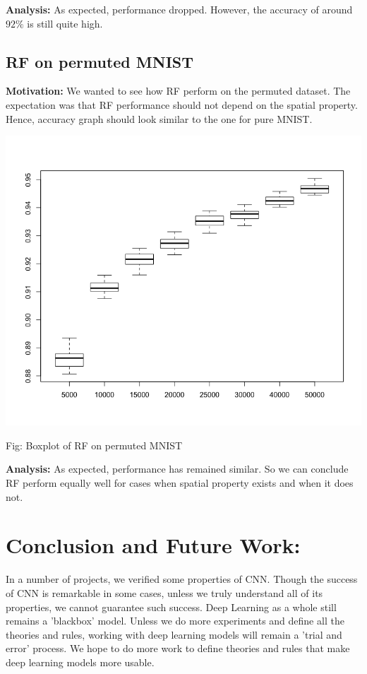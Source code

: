 \documentclass{article}
\begin{document}
\textbf{Analysis:} As expected, performance dropped. However, the accuracy of around $92\%$ is still quite high.

\subsection*{RF on permuted MNIST}
\textbf{Motivation:} We wanted to see how RF perform on the permuted dataset. The expectation was that RF performance should not depend on the spatial property. Hence, accuracy graph should look similar to the one for pure MNIST.
\begin{center}
	\includegraphics[scale=0.35]{rf_permuted}
\end{center}
\begin{center}
	Fig: Boxplot of RF on permuted MNIST
\end{center}

\textbf{Analysis:} As expected, performance has remained similar. So we can conclude RF perform equally well for cases when spatial property exists and when it does not.


\section*{Conclusion and Future Work:}
In a number of projects, we verified some properties of CNN. Though the success of CNN is remarkable in some cases, unless we truly understand all of its properties, we cannot guarantee such success. Deep Learning as a whole still remains a 'blackbox' model. Unless we do more experiments and define all the theories and rules, working with deep learning models will remain a 'trial and error' process. We hope to do more work to define theories and rules that make deep learning models more usable.
\end{document}
